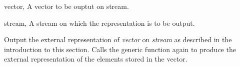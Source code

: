 \begin{optDefinition}
%
\begin{specargs}
    \item[vector, \classref{vector}] A vector to be ouptut on stream.
    \item[stream, \classref{stream}] A stream on which the representation is to
    be output.
\end{specargs}
%
\remarks%
Output the external representation of {\em vector\/} on {\em stream\/} as
described in the introduction to this section.  Calls the generic function again
to produce the external representation of the elements stored in the vector.
%
\end{optDefinition}
